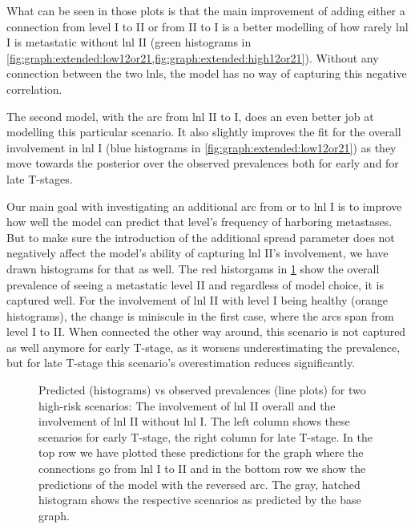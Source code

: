 \documentclass[\relativeRoot/main.tex]{subfiles}
\begin{document}
What can be seen in those plots is that the main improvement of adding either a connection from level I to II or from II to I is a better modelling of how rarely \gls{lnl} I is metastatic without \gls{lnl} II (green histograms in \cref{fig:graph:extended:low12or21,fig:graph:extended:high12or21}). Without any connection between the two \glspl{lnl}, the model has no way of capturing this negative correlation.

The second model, with the arc from \gls{lnl} II to I, does an even better job at modelling this particular scenario. It also slightly improves the fit for the overall involvement in \gls{lnl} I (blue histograms in \cref{fig:graph:extended:low12or21}) as they move towards the posterior over the observed prevalences both for early and for late T-stages.

Our main goal with investigating an additional arc from or to \gls{lnl} I is to improve how well the model can predict that level's frequency of harboring metastases. But to make sure the introduction of the additional spread parameter does not negatively affect the model's ability of capturing \gls{lnl} II's involvement, we have drawn histograms for that as well. The red historgams in \cref{fig:graph:extended:high12or21} show the overall prevalence of seeing a metastatic level II and regardless of model choice, it is captured well. For the involvement of \gls{lnl} II with level I being healthy (orange histograms), the change is miniscule in the first case, where the arcs span from level I to II. When connected the other way around, this scenario is not captured as well anymore for early T-stage, as it worsens underestimating the prevalence, but for late T-stage this scenario's overestimation reduces significantly.

\begin{figure}
    \centering
    \def\svgwidth{1.0\textwidth}
    
    \caption[
        Comparison of prevalences of high-risk scenarios for the two directions of the arc between LNL I and II
    ]{
        Predicted (histograms) vs observed prevalences (line plots) for two high-risk scenarios: The involvement of \gls{lnl} II overall and the involvement of \gls{lnl} II without \gls{lnl} I. The left column shows these scenarios for early T-stage, the right column for late T-stage. In the top row we have plotted these predictions for the graph where the connections go from \gls{lnl} I to II and in the bottom row we show the predictions of the model with the reversed arc. The gray, hatched histogram shows the respective scenarios as predicted by the base graph.
    }
    \label{fig:graph:extended:high12or21}
\end{figure}
\end{document}
